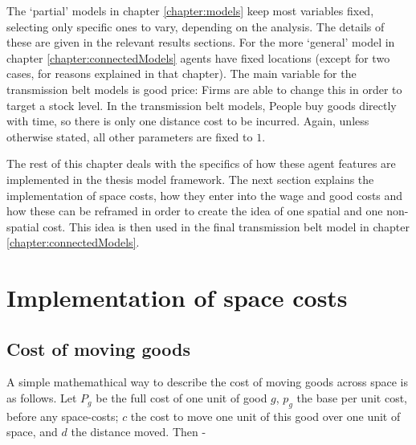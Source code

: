 The `partial' models in chapter \ref{chapter:models} keep most variables fixed, selecting only specific ones to vary, depending on the analysis. The details of these are given in the relevant results sections. For the more `general' model in chapter \ref{chapter:connectedModels} agents have fixed locations (except for two cases, for reasons explained in that chapter). The main variable for the transmission belt models is good price: Firms are able to change this in order to target a stock level. In the transmission belt models, People buy goods directly with time, so there is only one distance cost to be incurred. Again, unless otherwise stated, all other parameters are fixed to $1$.

The rest of this chapter deals with the specifics of how these agent features are implemented in the thesis model framework. The next section explains the implementation of space costs, how they enter into the wage and good costs and how these can be reframed in order to create the idea of one spatial and one non-spatial cost. This idea is then used in the final transmission belt model in chapter \ref{chapter:connectedModels}.

\section{Implementation of space costs \label{sec:spacecostgoods}}


\subsection{Cost of moving goods \label{sec:costmovinggoodsFramework}}

A simple mathemathical way to describe the cost of moving goods across space is as follows. Let $P_g$ be the full cost of one unit of good $g$, $p_g$ the base per unit cost, before any space-costs; $c$ the cost to move one unit of this good over one unit of space, and $d$ the distance moved. Then - 

